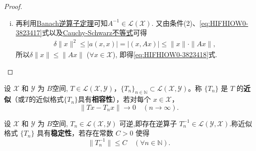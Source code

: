 \documentclass[../../main.tex]{subfiles}%
\begin{document}
\begin{proof}
\begin{enumerate}[(i)]
\item 再利用\hyperref[theorem:泛函分析--Banach逆算子定理]{Banach逆算子定理}可知$A^{-1}\in\mathscr{L}(\mathscr{X})$. 又由条件(2)、\eqref{eq:HIFHIOW0-3823417}式以及\hyperref[theorem:泛函分析--Cauchy-Schwarz不等式]{Cauchy-Schwarz不等式}可得
\begin{align*}
\delta\|x\|^2 \leqslant |a(x,x)| = |(x,Ax)| \leqslant \|x\| \cdot \|Ax\|,
\end{align*}
所以$\delta\|x\| \leqslant \|Ax\|$ ($\forall x\in\mathscr{X}$), 即得\eqref{eq:HIFHIOW0-3823418}式.
\end{enumerate}
\end{proof}

\begin{definition}[相容性]
设 $\mathscr{X} $ 和 $\mathscr{Y} $ 为 $B$空间, $T\in\mathscr{L} (\mathscr{X} ,\mathscr{Y} )$，$\{T_n\}_{n\in\mathbb{N}}\subset\mathscr{L} (\mathscr{X} ,\mathscr{Y} )$。称 $\{T_n\}$ 是 $T$ 的\textbf{近似}（或$T$的近似格式$\{T_n\}$具有\textbf{相容性}），若对每个 $x\in\mathscr{X} $，
\[
\|Tx - T_nx\| \to 0 \quad (n\to\infty).
\]
\end{definition}

\begin{definition}[稳定性]
设 $\mathscr{X} $ 和 $\mathscr{Y} $ 为 $B$空间,  $T_n\in\mathscr{L} (\mathscr{X} ,\mathscr{Y} )$ 可逆,即存在逆算子 $T_n^{-1}\in\mathscr{L} (\mathscr{Y} ,\mathscr{X} )$.称近似格式 $\{T_n\}$ 具有\textbf{稳定性}，若存在常数 $C>0$ 使得
\[
\|T_n^{-1}\| \leqslant C \quad (\forall n\in\mathbb{N}).
\]
\end{definition}
\end{document}
